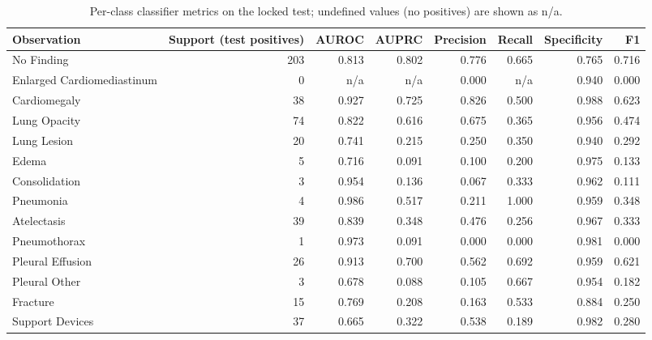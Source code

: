 \begin{table}[t]
\centering
\scriptsize
\begin{tabular}{lrrrrrrr}
\hline
Observation & Support (test positives) & AUROC & AUPRC & Precision & Recall & Specificity & F1 \\
\hline
No Finding & 203 & 0.813 & 0.802 & 0.776 & 0.665 & 0.765 & 0.716 \\
Enlarged Cardiomediastinum & 0 & n/a & n/a & 0.000 & n/a & 0.940 & 0.000 \\
Cardiomegaly & 38 & 0.927 & 0.725 & 0.826 & 0.500 & 0.988 & 0.623 \\
Lung Opacity & 74 & 0.822 & 0.616 & 0.675 & 0.365 & 0.956 & 0.474 \\
Lung Lesion & 20 & 0.741 & 0.215 & 0.250 & 0.350 & 0.940 & 0.292 \\
Edema & 5 & 0.716 & 0.091 & 0.100 & 0.200 & 0.975 & 0.133 \\
Consolidation & 3 & 0.954 & 0.136 & 0.067 & 0.333 & 0.962 & 0.111 \\
Pneumonia & 4 & 0.986 & 0.517 & 0.211 & 1.000 & 0.959 & 0.348 \\
Atelectasis & 39 & 0.839 & 0.348 & 0.476 & 0.256 & 0.967 & 0.333 \\
Pneumothorax & 1 & 0.973 & 0.091 & 0.000 & 0.000 & 0.981 & 0.000 \\
Pleural Effusion & 26 & 0.913 & 0.700 & 0.562 & 0.692 & 0.959 & 0.621 \\
Pleural Other & 3 & 0.678 & 0.088 & 0.105 & 0.667 & 0.954 & 0.182 \\
Fracture & 15 & 0.769 & 0.208 & 0.163 & 0.533 & 0.884 & 0.250 \\
Support Devices & 37 & 0.665 & 0.322 & 0.538 & 0.189 & 0.982 & 0.280 \\
\hline
\end{tabular}
\caption{Per-class classifier metrics on the locked test; undefined values (no positives) are shown as n/a.}
\label{tab:table3_per_class_classifier_metrics}
\end{table}
